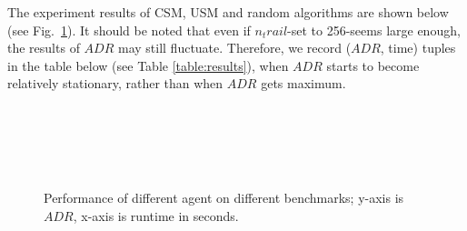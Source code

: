 \documentclass[conference]{IEEEtran}
\begin{document}
	The experiment results of CSM, USM and random algorithms are shown below (see Fig.~\ref{fig:agent_adr_time}).
	It should be noted that even if $n_trail$-set to 256-seems large enough, the results of $ADR$ may still fluctuate.
	Therefore, we record ($ADR$, time) tuples in the table below (see Table \ref{table:results}), when $ADR$ starts
	to become relatively stationary, rather than when $ADR$ gets maximum. 
	
	\begin{figure}[t]
		\centering
		\\
		\\
		\\
		\\
 \caption{Performance of different agent on different benchmarks; y-axis is $ADR$,
			x-axis is runtime in seconds.}
		\label{fig:agent_adr_time}
	\end{figure}
\end{document}
